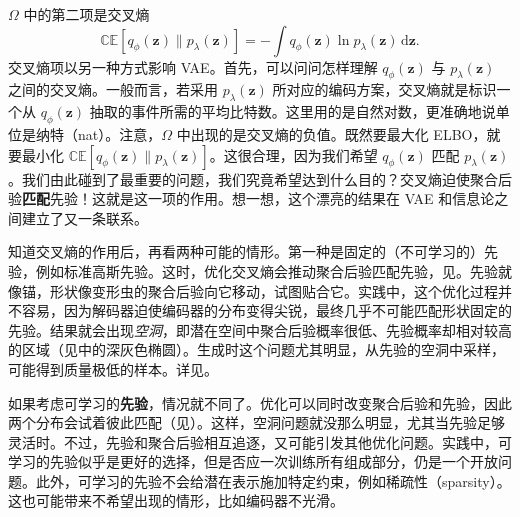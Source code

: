 $\Omega$ 中的第二项是交叉熵
\begin{equation}
\mathbb{CE}[q_\phi(\mathbf{z})\|p_\lambda(\mathbf{z})]
 =-\int q_\phi(\mathbf{z})\ln p_\lambda(\mathbf{z})\,\mathrm{d}\mathbf{z}.
\tag{5.46}\label{eq:05-46}
\end{equation}
交叉熵项以另一种方式影响 VAE。首先，可以问问怎样理解 $q_\phi(\mathbf{z})$ 与 $p_\lambda(\mathbf{z})$ 之间的交叉熵。一般而言，若采用 $p_\lambda(\mathbf{z})$ 所对应的编码方案，交叉熵就是标识一个从 $q_\phi(\mathbf{z})$ 抽取的事件所需的平均比特数。这里用的是自然对数，更准确地说单位是纳特（nat）。注意，$\Omega$ 中出现的是交叉熵的负值。既然要最大化 ELBO，就要最小化 $\mathbb{CE}[q_\phi(\mathbf{z})\|p_\lambda(\mathbf{z})]$。这很合理，因为我们希望 $q_\phi(\mathbf{z})$ 匹配 $p_\lambda(\mathbf{z})$。我们由此碰到了最重要的问题，我们究竟希望达到什么目的？交叉熵迫使聚合后验\textbf{匹配}先验！这就是这一项的作用。想一想，这个漂亮的结果在 VAE 和信息论之间建立了又一条联系。

知道交叉熵的作用后，再看两种可能的情形。第一种是固定的（不可学习的）先验，例如标准高斯先验。这时，优化交叉熵会推动聚合后验匹配先验，见。先验就像锚，形状像变形虫的聚合后验向它移动，试图贴合它。实践中，这个优化过程并不容易，因为解码器迫使编码器的分布变得尖锐，最终几乎不可能匹配形状固定的先验。结果就会出现\emph{空洞}，即潜在空间中聚合后验概率很低、先验概率却相对较高的区域（见中的深灰色椭圆）。生成时这个问题尤其明显，从先验的空洞中采样，可能得到质量极低的样本。详见。

如果考虑可学习的\textbf{先验}，情况就不同了。优化可以同时改变聚合后验和先验，因此两个分布会试着彼此匹配（见）。这样，空洞问题就没那么明显，尤其当先验足够灵活时。不过，先验和聚合后验相互追逐，又可能引发其他优化问题。实践中，可学习的先验似乎是更好的选择，但是否应一次训练所有组成部分，仍是一个开放问题。此外，可学习的先验不会给潜在表示施加特定约束，例如稀疏性（sparsity）。
这也可能带来不希望出现的情形，比如编码器不光滑。



